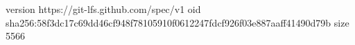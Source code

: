 version https://git-lfs.github.com/spec/v1
oid sha256:58f3dc17c69dd46cf948f78105910f0612247fdcf926f03e887aaff41490d79b
size 5566
